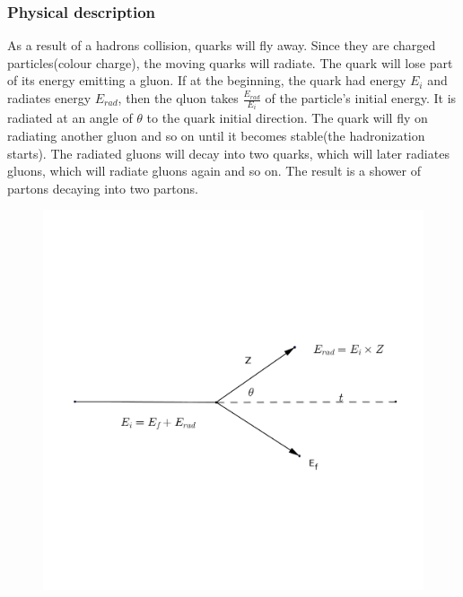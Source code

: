 \documentclass[12pt,a4paper]{article}
\begin{document}
\subsubsection{Physical description}
\noindent As a result of a hadrons collision, quarks will fly away. Since they are charged particles(colour charge), the moving quarks will radiate. The quark will lose part of its energy emitting a gluon. If at the beginning, the quark had energy $E_i$ and radiates energy $E_{rad}$, then the qluon takes $\frac{E_{rad}}{E_i}$ of the particle's initial energy. It is radiated at an angle of $\theta$ to the quark initial direction. The quark will fly on radiating another gluon and so on until it becomes stable(the hadronization starts). The radiated gluons will decay into two quarks, which will later radiates gluons,  which will radiate gluons again and so on. The result is a shower of partons decaying into two partons. 
\begin{figure}[hbtp]
\centering
\includegraphics[scale=.15]{tt.png}
\end{figure}
\end{document}
